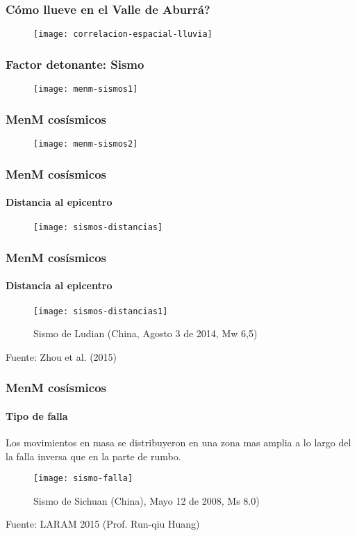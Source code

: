 \documentclass[12pt]{beamer}
\begin{document}
\begin{frame}
\frametitle{Cómo llueve en el Valle de Aburrá?}
\begin{figure}
\centering
\texttt{[image: correlacion-espacial-lluvia]} 
\end{figure}
\end{frame}
\begin{frame}
\frametitle{Factor detonante: Sismo}
\begin{figure}
\centering
\texttt{[image: menm-sismos1]} 
\end{figure}
\end{frame}
\begin{frame}
\frametitle{MenM cosísmicos}
\begin{figure}
\centering
\texttt{[image: menm-sismos2]} 
\end{figure}
\end{frame}
\begin{frame}
\frametitle{MenM cosísmicos}
\framesubtitle{Distancia al epicentro}
\begin{figure}
\centering
\texttt{[image: sismos-distancias]} 
\end{figure}
\end{frame}
\begin{frame}
\frametitle{MenM cosísmicos}
\framesubtitle{Distancia al epicentro}
\begin{figure}
\centering
\texttt{[image: sismos-distancias1]} 
\caption{Sismo de Ludian (China, Agosto 3 de 2014, Mw 6,5)}
\end{figure}
\tiny{Fuente: Zhou et al. (2015)}
\end{frame}
\begin{frame}
\frametitle{MenM cosísmicos}
\framesubtitle{Tipo de falla}
\scriptsize{Los movimientos en masa se distribuyeron en una zona mas amplia a lo largo del la falla inversa que en la parte de rumbo.}
\begin{figure}
\centering
\texttt{[image: sismo-falla]} 
\caption{Sismo de Sichuan (China), Mayo 12 de 2008, Ms 8.0)}
\end{figure}
\tiny{Fuente: LARAM 2015 (Prof. Run-qiu Huang) }
\end{frame}
\end{document}
